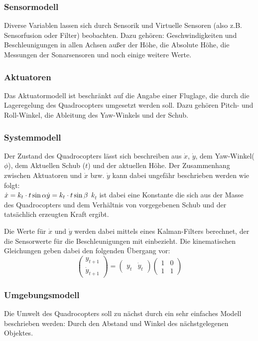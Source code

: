\subsubsection{Sensormodell}
Diverse Variablen lassen sich durch Sensorik und Virtuelle Sensoren (also z.B. Sensorfusion oder Filter) beobachten.
Dazu gehören: Geschwindigkeiten und Beschleunigungen in allen Achsen außer der Höhe, die Absolute Höhe, die Messungen der Sonarsensoren und noch einige weitere Werte.

\subsubsection{Aktuatoren}
Das Aktuatormodell ist beschränkt auf die Angabe einer Fluglage, die durch die Lageregelung des Quadrocopters umgesetzt werden soll. Dazu gehören Pitch- und Roll-Winkel, die Ableitung des Yaw-Winkels und der Schub.

\subsubsection{Systemmodell}
Der Zustand des Quadrocopters lässt sich beschreiben aus $\dot x$, $\dot y$, dem Yaw-Winkel($\phi$), dem Aktuellen Schub ($t$) und der aktuellen Höhe.
Der Zusammenhang zwischen Aktuatoren und $\dot x$ bzw. $\dot y$ kann dabei ungefähr beschrieben werden wie folgt: \\
\begin{math}
	\dot x = k_t \cdot t \sin \alpha \\ 
	\dot y = k_t \cdot t \sin \beta \\
\end{math}
$k_t$ ist dabei eine Konstante die sich aus der Masse des Quadrocopters und dem Verhältnis von vorgegebenen Schub und der tatsächlich erzeugten Kraft ergibt.

Die Werte für $\dot x$ und $\dot y$ werden dabei mittels eines Kalman-Filters berechnet, der die Sensorwerte für die Beschleunigungen mit einbezieht.
Die kinematischen Gleichungen geben dabei den folgenden Übergang vor:
\begin{equation}
	\left(
		\begin{array}{c}
			y_{t+1} \\ \dot y_{t+1}
		\end{array}
	\right)
	=
	\left(
		\begin{array}{cc}
			y_t & \dot y_t
		\end{array}
	\right)
	\left(
		\begin{array}{cc}
			1	& 0 \\
			1	& 1
		\end{array}
	\right)
	\label{Kalman_T}
\end{equation}


\subsubsection{Umgebungsmodell}
Die Umwelt des Quadrocopters soll zu nächst durch ein sehr einfaches Modell beschrieben werden: Durch den Abstand und Winkel des nächstgelegenen Objektes.
